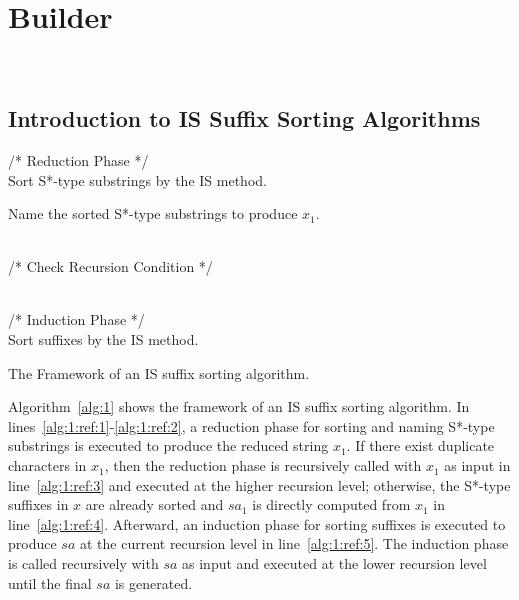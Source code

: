 \documentclass[10pt,journal,compsoc]{IEEEtran}
\begin{document}
\section{Builder}~\label{sec:builder}

\subsection{Introduction to IS Suffix Sorting Algorithms} \label{subsec:improvement}

\begin{algorithm}
	\SetAlgoNoLine
	
	/* Reduction Phase */ \\
	Sort S*-type substrings by the IS method. \label{alg:1:ref:1}
	
	Name the sorted S*-type substrings to produce $x_1$. \label{alg:1:ref:2}
	
	~\\
	
	/* Check Recursion Condition */ \\	
	
	~\\
	
	/* Induction Phase */ \\
	Sort suffixes by the IS method.  \label{alg:1:ref:5}
	
	
	\caption{The Framework of an IS suffix sorting algorithm.}
	
	\label{alg:1}
\end{algorithm}

Algorithm~\ref{alg:1} shows the framework of an IS suffix sorting algorithm. In lines~\ref{alg:1:ref:1}-\ref{alg:1:ref:2}, a reduction phase for sorting and naming S*-type substrings is executed to produce the reduced string $x_1$. If there exist duplicate characters in $x_1$, then the reduction phase is recursively called with $x_1$ as input in line~\ref{alg:1:ref:3} and executed at the higher recursion level; otherwise, the S*-type suffixes in $x$ are already sorted and $sa_1$ is directly computed from $x_1$ in line~\ref{alg:1:ref:4}. Afterward, an induction phase for sorting suffixes is executed to produce $sa$ at the current recursion level in line~\ref{alg:1:ref:5}. The induction phase is called recursively with $sa$ as input and executed at the lower recursion level until the final $sa$ is generated.
\end{document}
